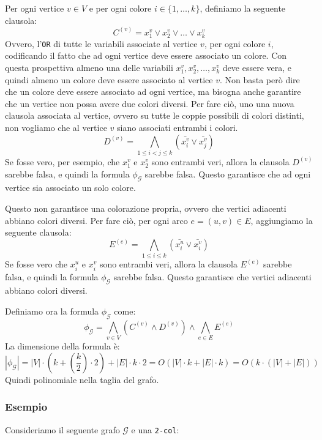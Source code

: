     Per ogni vertice $v \in V$ e per ogni colore $i \in \{1, \dots, k\}$, definiamo 
    la seguente clausola:
    \[
        C^{(v)} = x_1^v \lor x_2^v \lor \dots \lor x_k^v
    \]
    Ovvero, l'\texttt{OR} di tutte le variabili associate al vertice $v$, per ogni colore $i$,
    codificando il fatto che ad ogni vertice deve essere associato un colore. Con questa prospettiva
    almeno una delle variabili $x_1^v, x_2^v, \dots, x_k^v$ deve essere vera, e quindi almeno 
    un colore deve essere associato al vertice $v$.
    Non basta però dire che un colore deve essere associato ad ogni vertice, ma bisogna anche
    garantire che un vertice non possa avere due colori diversi. Per fare ciò, uno una nuova 
    clausola associata al vertice, ovvero su tutte le coppie possibili di colori 
    distinti, non vogliamo che al vertice $v$ siano associati entrambi i colori.
    \[
      D^{(v)} = \bigwedge_{1 \leq i < j \leq k} (\bar{x_i^v} \lor \bar{x_j^v})
    \]
    Se fosse vero, per esempio, che $x_1^v$ e $x_2^v$ sono entrambi veri, allora la clausola
    $D^{(v)}$ sarebbe falsa, e quindi la formula $\phi_\mathcal{G}$ sarebbe falsa. Questo
    garantisce che ad ogni vertice sia associato un solo colore.

    Questo non garantisce una colorazione propria, ovvero che vertici adiacenti abbiano colori
    diversi. Per fare ciò, per ogni arco $e = (u, v) \in E$, aggiungiamo la seguente clausola:
    \[
        E^{(e)} = \bigwedge_{1 \leq i \leq k} (\bar{x_i^u} \lor \bar{x_i^v})
    \]
    Se fosse vero che $x_i^u$ e $x_i^v$ sono entrambi veri, allora la clausola $E^{(e)}$ sarebbe
    falsa, e quindi la formula $\phi_\mathcal{G}$ sarebbe falsa. Questo garantisce che vertici
    adiacenti abbiano colori diversi.

    Definiamo ora la formula $\phi_\mathcal{G}$ come:
    \begin{equation}
        \label{eq:phi}
        \phi_\mathcal{G} = \bigwedge_{v \in V} \left(C^{(v)} \land D^{(v)}\right) \land \bigwedge_{e \in E} E^{(e)}
    \end{equation}
La dimensione della formula è:
\[
    |\phi_\mathcal{G}| = |V| \cdot \left(k + \left(\frac{k}{2}\right) \cdot 2 \right) 
    + |E| \cdot k \cdot 2 = O(|V| \cdot k + |E| \cdot k) = O( k \cdot (|V| + |E|) )
\]
Quindi polinomiale nella taglia del grafo.
\subsubsection{Esempio}
Consideriamo il seguente grafo $\mathcal{G}$ e una \texttt{2-col}:

